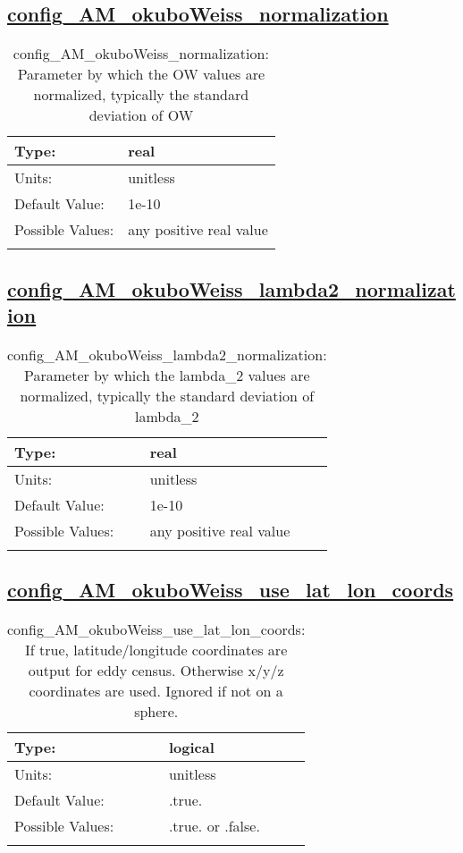 \subsection[config\_AM\_okuboWeiss\_normalization]{\hyperref[sec:nm_tab_AM_okuboWeiss]{config\_AM\_okuboWeiss\_normalization}}
\label{subsec:nm_sec_config_AM_okuboWeiss_normalization}
\begin{center}
\begin{longtable}{| p{2.0in} || p{4.0in} |}
    \hline
    Type: & real \\
    \hline
    Units: & \si{unitless} \\
    \hline
    Default Value: & 1e-10 \\
    \hline
    Possible Values: & any positive real value \\
    \hline
    \caption{config\_AM\_okuboWeiss\_normalization: Parameter by which the OW values are normalized, typically the standard deviation of OW}
\end{longtable}
\end{center}
\subsection[config\_AM\_okuboWeiss\_lambda2\_normalization]{\hyperref[sec:nm_tab_AM_okuboWeiss]{config\_AM\_okuboWeiss\_lambda2\_normalization}}
\label{subsec:nm_sec_config_AM_okuboWeiss_lambda2_normalization}
\begin{center}
\begin{longtable}{| p{2.0in} || p{4.0in} |}
    \hline
    Type: & real \\
    \hline
    Units: & \si{unitless} \\
    \hline
    Default Value: & 1e-10 \\
    \hline
    Possible Values: & any positive real value \\
    \hline
    \caption{config\_AM\_okuboWeiss\_lambda2\_normalization: Parameter by which the lambda\_2 values are normalized, typically the standard deviation of lambda\_2}
\end{longtable}
\end{center}
\subsection[config\_AM\_okuboWeiss\_use\_lat\_lon\_coords]{\hyperref[sec:nm_tab_AM_okuboWeiss]{config\_AM\_okuboWeiss\_use\_lat\_lon\_coords}}
\label{subsec:nm_sec_config_AM_okuboWeiss_use_lat_lon_coords}
\begin{center}
\begin{longtable}{| p{2.0in} || p{4.0in} |}
    \hline
    Type: & logical \\
    \hline
    Units: & \si{unitless} \\
    \hline
    Default Value: & .true. \\
    \hline
    Possible Values: & .true. or .false. \\
    \hline
    \caption{config\_AM\_okuboWeiss\_use\_lat\_lon\_coords: If true, latitude/longitude coordinates are output for eddy census. Otherwise x/y/z coordinates are used. Ignored if not on a sphere.}
\end{longtable}
\end{center}

